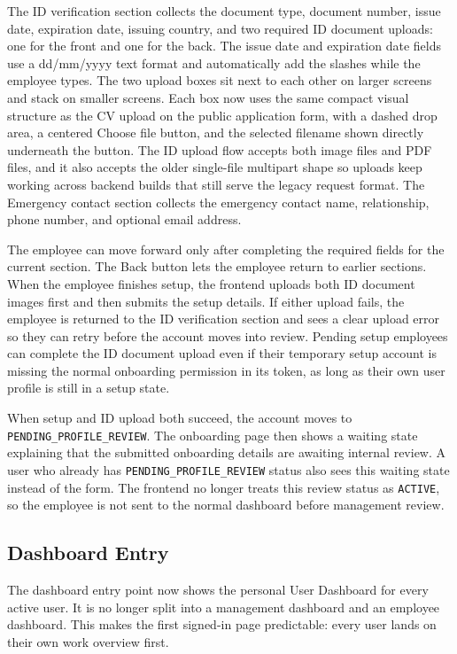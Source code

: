 \documentclass[11pt]{article}
\newcommand{\code}[1]{\nolinkurl{#1}}
\begin{document}
The ID verification section collects the document type, document number, issue date, expiration date, issuing country, and two required ID document uploads: one for the front and one for the back. The issue date and expiration date fields use a dd/mm/yyyy text format and automatically add the slashes while the employee types. The two upload boxes sit next to each other on larger screens and stack on smaller screens. Each box now uses the same compact visual structure as the CV upload on the public application form, with a dashed drop area, a centered Choose file button, and the selected filename shown directly underneath the button. The ID upload flow accepts both image files and PDF files, and it also accepts the older single-file multipart shape so uploads keep working across backend builds that still serve the legacy request format. The Emergency contact section collects the emergency contact name, relationship, phone number, and optional email address.

The employee can move forward only after completing the required fields for the current section. The Back button lets the employee return to earlier sections. When the employee finishes setup, the frontend uploads both ID document images first and then submits the setup details. If either upload fails, the employee is returned to the ID verification section and sees a clear upload error so they can retry before the account moves into review. Pending setup employees can complete the ID document upload even if their temporary setup account is missing the normal onboarding permission in its token, as long as their own user profile is still in a setup state.

When setup and ID upload both succeed, the account moves to \code{PENDING_PROFILE_REVIEW}. The onboarding page then shows a waiting state explaining that the submitted onboarding details are awaiting internal review. A user who already has \code{PENDING_PROFILE_REVIEW} status also sees this waiting state instead of the form. The frontend no longer treats this review status as \code{ACTIVE}, so the employee is not sent to the normal dashboard before management review.

\subsection{Dashboard Entry}

The dashboard entry point now shows the personal User Dashboard for every active user. It is no longer split into a management dashboard and an employee dashboard. This makes the first signed-in page predictable: every user lands on their own work overview first.
\end{document}
